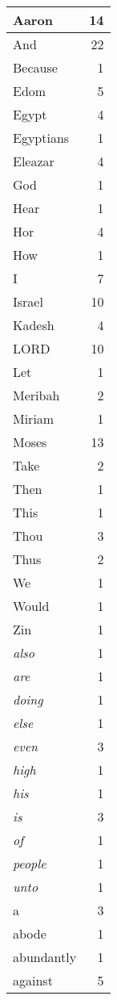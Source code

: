 \begin{center}
\begin{longtable}{l|r}
\hline \hline
\endlastfoot
Aaron & 14 \\ \hline
And & 22 \\ \hline
Because & 1 \\ \hline
Edom & 5 \\ \hline
Egypt & 4 \\ \hline
Egyptians & 1 \\ \hline
Eleazar & 4 \\ \hline
God & 1 \\ \hline
Hear & 1 \\ \hline
Hor & 4 \\ \hline
How & 1 \\ \hline
I & 7 \\ \hline
Israel & 10 \\ \hline
Kadesh & 4 \\ \hline
LORD & 10 \\ \hline
Let & 1 \\ \hline
Meribah & 2 \\ \hline
Miriam & 1 \\ \hline
Moses & 13 \\ \hline
Take & 2 \\ \hline
Then & 1 \\ \hline
This & 1 \\ \hline
Thou & 3 \\ \hline
Thus & 2 \\ \hline
We & 1 \\ \hline
Would & 1 \\ \hline
Zin & 1 \\ \hline
\emph{also} & 1 \\ \hline
\emph{are} & 1 \\ \hline
\emph{doing} & 1 \\ \hline
\emph{else} & 1 \\ \hline
\emph{even} & 3 \\ \hline
\emph{high} & 1 \\ \hline
\emph{his} & 1 \\ \hline
\emph{is} & 3 \\ \hline
\emph{of} & 1 \\ \hline
\emph{people} & 1 \\ \hline
\emph{unto} & 1 \\ \hline
a & 3 \\ \hline
abode & 1 \\ \hline
abundantly & 1 \\ \hline
against & 5 \\ \hline

\end{longtable}
\end{center}
